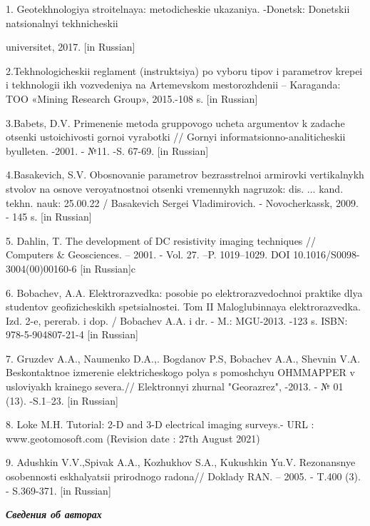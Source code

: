 \begin{noparindent}
1. Geotekhnologiya stroitel\textquotesingle naya: metodicheskie
ukazaniya. -Donetsk: Donetskii natsional\textquotesingle nyi
tekhnicheskii

universitet, 2017. {[}in Russian{]}

2.Tekhnologicheskii reglament (instruktsiya) po vyboru tipov i
parametrov krepei i tekhnologii ikh vozvedeniya na
Artem\textquotesingle evskom mestorozhdenii -- Karaganda: TOO «Mining
Research Group», 2015.-108 s. {[}in Russian{]}

3.Babets, D.V. Primenenie metoda gruppovogo ucheta argumentov k zadache
otsenki ustoichivosti gornoi vyrabotki // Gornyi
informatsionno-analiticheskii byulleten\textquotesingle. -2001. - №11.
-S. 67-69. {[}in Russian{]}

4.Basakevich, S.V. Obosnovanie parametrov
bezrasstrel\textquotesingle noi armirovki vertikal\textquotesingle nykh
stvolov na osnove veroyatnostnoi otsenki vremennykh nagruzok: dis. ...
kand. tekhn. nauk: 25.00.22 / Basakevich Sergei Vladimirovich. -
Novocherkassk, 2009. - 145 s. {[}in Russian{]}

5. Dahlin, T. The development of DC resistivity imaging techniques //
Computers \& Geosciences. -- 2001. - Vol. 27. --P. 1019--1029. DOI
10.1016/S0098-3004(00)00160-6 {[}in Russian{]}c

6. Bobachev, A.A. Elektrorazvedka: posobie po elektrorazvedochnoi
praktike dlya studentov geofizicheskikh spetsial\textquotesingle nostei.
Tom II Maloglubinnaya elektrorazvedka. Izd. 2-e, pererab. i dop. /
Bobachev A.A. i dr. - M.: MGU-2013. -123 s. ISBN: 978-5-904807-21-4
{[}in Russian{]}

7. Gruzdev A.A., Naumenko D.A.,. Bogdanov P.S, Bobachev A.A., Shevnin
V.A. Beskontaktnoe izmerenie elektricheskogo polya s
pomoshch\textquotesingle yu OHMMAPPER v usloviyakh krainego severa.//
Elektronnyi zhurnal "Georazrez", -2013. - № 01 (13). -S.1--23. {[}in
Russian{]}

8. Loke M.H. Tutorial: 2-D and 3-D electrical imaging surveys.- URL :
www.geotomosoft.com (Revision date : 27th August 2021)

9. Adushkin V.V.,Spivak A.A., Kozhukhov S.A., Kukushkin Yu.V.
Rezonansnye osobennosti eskhalyatsii prirodnogo radona// Doklady RAN. --
2005. - T.400 (3). - S.369-371. {[}in Russian{]}
\end{noparindent}

\emph{{\bfseries Сведения об авторах}}

